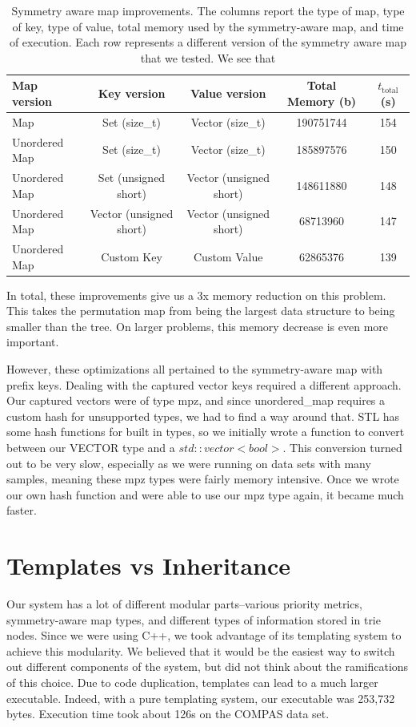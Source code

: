 \begin{table}[t!]
\begin{tabular}{l | c | c | c | c }
Map version & Key version & Value version & Total Memory (b) & $t_\text{total}$ (s)\\
\hline
Map & Set (size\_t) & Vector (size\_t) & 190751744 & 154 \\
Unordered Map & Set (size\_t) & Vector (size\_t) & 185897576 & 150 \\
Unordered Map & Set  (unsigned short) & Vector (unsigned short) & 148611880 & 148 \\
Unordered Map & Vector (unsigned short) & Vector (unsigned short) & 68713960 & 147 \\
Unordered Map & Custom Key & Custom Value & 62865376 & 139 \\
\end{tabular}
\vspace{4mm}
\caption{Symmetry aware map improvements.
%
The columns report the type of map,
type of key, type of value,
total memory used by the symmetry-aware map, and time of execution.
%
Each row represents a different version of the symmetry aware map that we tested.
We see that 
}
\label{tab:pmap}
\end{table}

In total, these improvements give us a 3x memory reduction on this problem.
This takes the permutation map from being the largest data structure to being smaller than the tree.
On larger problems, this memory decrease is even more important.

However, these optimizations all pertained to the symmetry-aware map with prefix keys.
Dealing with the captured vector keys required a different approach.
Our captured vectors were of type mpz, and since unordered\_map requires a custom hash for unsupported types, we had to find a way around that.
STL has some hash functions for built in types, so we initially wrote a function to convert between our VECTOR type and a $std::vector<bool>$.
This conversion turned out to be very slow, especially as we were running on data sets with many samples, meaning these mpz types were fairly memory intensive.
Once we wrote our own hash function and were able to use our mpz type again, it became much faster.

\section{Templates vs Inheritance}
Our system has a lot of different modular parts--various priority metrics, symmetry-aware map types, and different types of information stored in trie nodes.
Since we were using C++, we took advantage of its templating system to achieve this modularity.
We believed that it would be the easiest way to switch out different components of the system, but did not think about the ramifications of this choice.
Due to code duplication, templates can lead to a much larger executable.
Indeed, with a pure templating system, our executable was 253,732 bytes.
Execution time took about 126s on the COMPAS data set.


